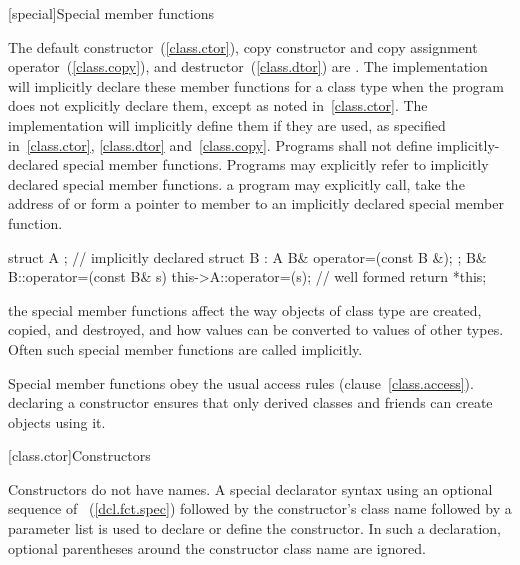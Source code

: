 [special]{Special member functions}


%
%
%
%

\pnum
{}%
%
%
The default constructor~(\ref{class.ctor}),
copy constructor and copy assignment operator~(\ref{class.copy}),
and destructor~(\ref{class.dtor}) are
.
The implementation will implicitly declare these member functions for a class
type when the program does not explicitly declare them, except as noted
in~\ref{class.ctor}.
The implementation will implicitly define them if they are used, as specified
in~\ref{class.ctor}, \ref{class.dtor} and~\ref{class.copy}.
Programs shall not define implicitly-declared special member functions.
Programs may explicitly refer to implicitly declared special member functions.
\enterexample
a program may explicitly call, take the address of or form a pointer to member
to an implicitly declared special member function.

\begin{codeblock}
struct A { };                   // implicitly declared 
struct B : A {
	B& operator=(const B &);
};
B& B::operator=(const B& s) {
	this->A::operator=(s);  // well formed
	return *this;
}
\end{codeblock}
\exitexampleb
\enternote
the special member functions affect the way objects of class type are created,
copied, and destroyed, and how values can be converted to values of other types.
Often such special member functions are called implicitly.
\exitnote

\pnum
{}%
Special member functions obey the usual access rules (clause~\ref{class.access}).
\enterexample
declaring a constructor
ensures that only derived classes and friends can create objects using it.
\exitexample

[class.ctor]{Constructors}%

\pnum
Constructors do not have names.
A special declarator syntax using an optional sequence of
~(\ref{dcl.fct.spec}) followed by the
constructor's class name followed by a parameter list
is used to declare or define the constructor.
In such a declaration, optional parentheses around the constructor class name
are ignored.
\enterexample

